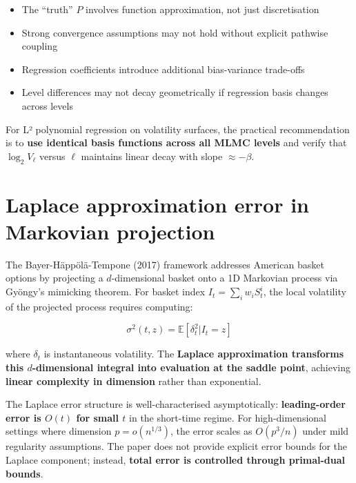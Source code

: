 \documentclass[11pt,a4paper]{article}
\begin{document}
\begin{itemize}[leftmargin=*,topsep=5pt,itemsep=3pt]
\item The ``truth'' $P$ involves function approximation, not just discretisation
\item Strong convergence assumptions may not hold without explicit pathwise coupling
\item Regression coefficients introduce additional bias-variance trade-offs
\item Level differences may not decay geometrically if regression basis changes across levels
\end{itemize}

\noindent For L² polynomial regression on volatility surfaces, the practical recommendation is to \textbf{use identical basis functions across all MLMC levels} and verify that $\log_2 V_\ell$ versus $\ell$ maintains linear decay with slope $\approx -\beta$.

\section{Laplace approximation error in Markovian projection}

The Bayer-Häppölä-Tempone (2017) framework addresses American basket options by projecting a $d$-dimensional basket onto a 1D Markovian process via Gyöngy's mimicking theorem. For basket index $I_t = \sum_i w_i S_t^i$, the local volatility of the projected process requires computing:

\begin{equation}
\sigma^2(t,z) = \mathbb{E}[\delta_t^2 | I_t = z]
\end{equation}

\noindent where $\delta_t$ is instantaneous volatility. The \textbf{Laplace approximation transforms this $d$-dimensional integral into evaluation at the saddle point}, achieving \textbf{linear complexity in dimension} rather than exponential.

\vspace{0.2cm}

\noindent The Laplace error structure is well-characterised asymptotically: \textbf{leading-order error is $O(t)$ for small $t$} in the short-time regime. For high-dimensional settings where dimension $p = o(n^{1/3})$, the error scales as $O(p^3/n)$ under mild regularity assumptions. The paper does not provide explicit error bounds for the Laplace component; instead, \textbf{total error is controlled through primal-dual bounds}.
\end{document}

